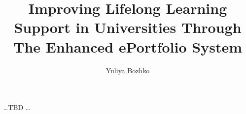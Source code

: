 \documentclass[11pt,PhD,twoside,openright]{muthesis}
\begin{document}



\title{Improving Lifelong Learning Support in Universities Through The
  Enhanced ePortfolio System}
\author{Yuliya Bozhko}

\beforeabstract

 


\newpage
\cleardoublepage
 
\ldots TBD \ldots

\newpage
\cleardoublepage

 

\newpage
\cleardoublepage

 

\newpage
\cleardoublepage
 
\tableofcontents
\newpage
\iftablespage
	\addvspace{10pt}
    \listoftables 
    \newpage
\fi
\iffigurespage
	\addvspace{10pt}
    \listoffigures
    \newpage
    \cleardoublepage
\fi

\afterpreface

\pagestyle{fancy}

\fancyhead{}
\fancyhead[LE,LO]{\slshape \leftmark}

\fancyfoot{} 
\fancyfoot[LE,RO]{\thepage} 
\renewcommand{\headrulewidth}{0.4pt}
\renewcommand{\footrulewidth}{0pt}


 


 
 
 
 
 

\cleardoublepage
{} 
{}
             

\appendix







\end{document}

